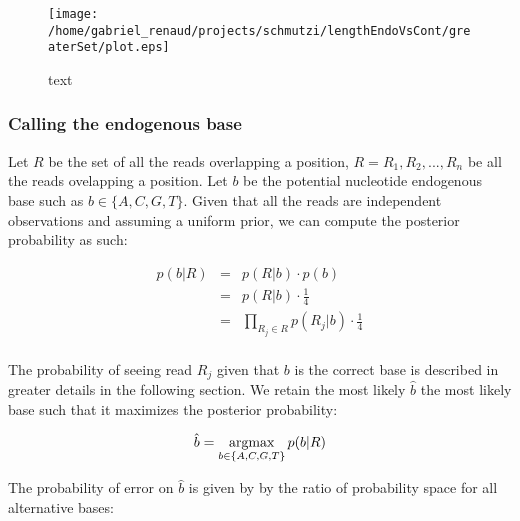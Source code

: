 \documentclass[a4paper,12pt]{article}
\newcommand{\argmax}{\operatornamewithlimits{argmax}}
\begin{document}


\label{seq:lengthdistendo}
\begin{figure}[H]
\centering
\texttt{[image: /home/gabriel\_renaud/projects/schmutzi/lengthEndoVsCont/greaterSet/plot.eps]}
\caption{text}
\end{figure}


















\subsubsection{Calling the endogenous base}
\label{sec:callingendobase}

\noindent Let $R$ be the set of all the reads overlapping a position, $R={R_1,R_2,...,R_n}$ be all the reads ovelapping a position.  Let $b$ be the potential nucleotide endogenous base such as $b\in\{A,C,G,T\}$. Given that all the reads are independent observations and assuming a uniform prior, we can compute the posterior probability as such:

\begin{eqnarray}
  p(b|R)   & = & p(R|b) \cdot p(b)  \\
  & = & p(R|b) \cdot \frac {1} {4} \\
  & = & \prod_{R_j \in R} p(R_j|b) \cdot \frac {1} {4} \\
\label{eqn:idenp}
\end{eqnarray} 


\noindent The probability of seeing read $R_j$ given that $b$ is the correct base is described in greater details in the following section.  We retain the most likely $\hat{b}$ the most likely base such that it maximizes the posterior probability:

\begin{equation}
\hat{b} = \argmax_{b \in \{A,C,G,T\} }   p(b|R)
\end{equation} 


\noindent  The probability of error on $\hat{b}$ is given by by the ratio of probability space for all alternative bases:
\end{document}
